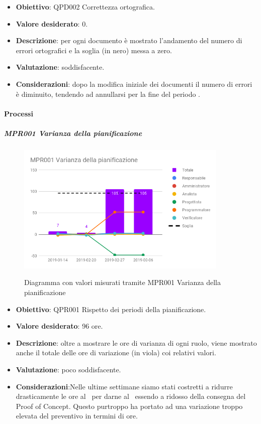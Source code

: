 	\begin{itemize}
		\item \textbf{Obiettivo}: QPD002 Correttezza ortografica.
		\item \textbf{Valore desiderato}: 0.
		\item \textbf{Descrizione}: per ogni documento è mostrato l'andamento del numero di errori ortografici e la soglia (in nero) messa a zero.
		\item \textbf{Valutazione}: soddisfacente.
		\item \textbf{Considerazioni}: dopo la modifica iniziale dei documenti il numero di errori è diminuito, tendendo ad annullarsi per la fine del periodo \RP.
	\end{itemize}



	\paragraph{Processi}

	\subparagraph{MPR001 Varianza della pianificazione}

	\begin{figure}[H]
		\centering
		\includegraphics[width=0.9\textwidth]{img/cruscotti/RP/MPR001.png}
		\label{immagineVarianzaPianificazioneRP}
		\caption{Diagramma con valori misurati tramite MPR001 Varianza della pianificazione}
	\end{figure}

	\begin{itemize}
		\item \textbf{Obiettivo}: QPR001 Rispetto dei periodi della pianificazione.
		\item \textbf{Valore desiderato}: 96 ore.
		\item \textbf{Descrizione}: oltre a mostrare le ore di varianza di ogni ruolo, viene mostrato anche il totale delle ore di variazione (in viola) coi relativi valori.
		\item \textbf{Valutazione}: poco soddisfacente.
		\item \textbf{Considerazioni}:Nelle ultime settimane siamo stati costretti a ridurre drasticamente le ore al \Prog\ per darne al \Progr\ essendo a ridosso della consegna del Proof of Concept. Questo purtroppo ha portato ad una variazione troppo elevata del preventivo in termini di ore.
	\end{itemize}


